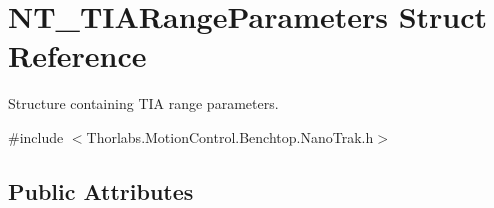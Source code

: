 \hypertarget{struct_n_t___t_i_a_range_parameters}{}\section{N\+T\+\_\+\+T\+I\+A\+Range\+Parameters Struct Reference}
\label{struct_n_t___t_i_a_range_parameters}


Structure containing T\+IA range parameters.  




{\ttfamily \#include $<$Thorlabs.\+Motion\+Control.\+Benchtop.\+Nano\+Trak.\+h$>$}

\subsection*{Public Attributes}

